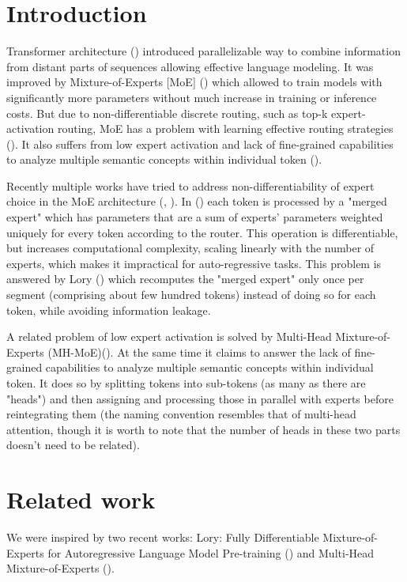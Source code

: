\documentclass[12pt]{article}
\begin{document}
\section{Introduction}
Transformer architecture (\cite{vaswani2017attention}) introduced parallelizable way to combine information from distant parts of sequences allowing effective language modeling. It was improved by Mixture-of-Experts [MoE] (\cite{shazeer2017outrageously}) which allowed to train models with significantly more parameters without much increase in training or inference costs. But due to non-differentiable discrete routing, such as top-k expert-activation routing, MoE has a problem with learning effective routing strategies (\cite{muqeeth2023soft}). It also suffers from low expert activation and lack of fine-grained capabilities to analyze multiple semantic concepts within individual token (\cite{wu2024multihead}).

Recently multiple works have tried to address non-differentiability of expert choice in the MoE architecture (\cite{Puigcerver2023FromST}, \cite{muqeeth2023soft}). In (\cite{muqeeth2023soft}) each token is processed  by a "merged expert" which has parameters that are a sum of experts' parameters weighted uniquely for every token according to the router. This operation is differentiable, but increases computational complexity, scaling linearly with the number of experts, which makes it impractical for auto-regressive tasks. This problem is answered by Lory (\cite{zhong2024lory}) which recomputes the "merged expert" only once per segment (comprising about few hundred tokens) instead of doing so for each token, while avoiding information leakage.

A related problem of low expert activation is solved by Multi-Head Mixture-of-Experts (MH-MoE)(\cite{wu2024multihead}). At the same time it claims to answer the lack of fine-grained capabilities to analyze multiple semantic concepts within individual token. 
It does so by splitting tokens into sub-tokens (as many as there are "heads") and then assigning and processing those in parallel with experts before reintegrating them (the naming convention resembles that of multi-head attention, though it is worth to note that the number of heads in these two parts doesn't need to be related).

\section{Related work}

 We were inspired by two recent works: Lory: Fully Differentiable Mixture-of-Experts for Autoregressive Language Model Pre-training (\cite{zhong2024lory}) and Multi-Head Mixture-of-Experts (\cite{wu2024multihead}).
\end{document}
